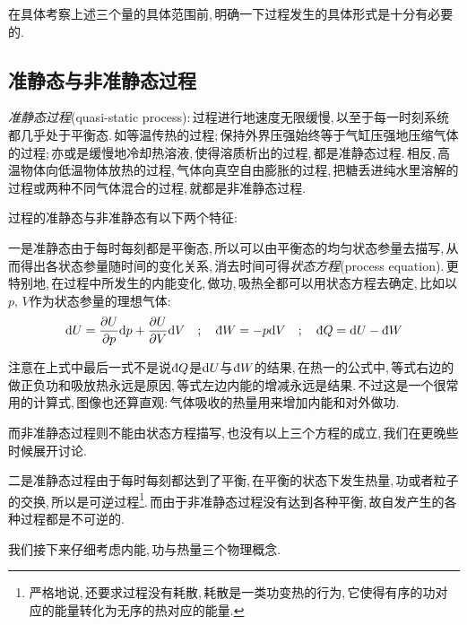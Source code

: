 在具体考察上述三个量的具体范围前,\,明确一下过程发生的具体形式是十分有必要的.


\subsection{准静态与非准静态过程}
\emph{准静态过程}(quasi-static process):\,过程进行地速度无限缓慢,\,以至于每一时刻系统都几乎处于平衡态.\,如等温传热的过程;\,保持外界压强始终等于气缸压强地压缩气体的过程;\,亦或是缓慢地冷却热溶液,\,使得溶质析出的过程,\,都是准静态过程.\,相反,\,高温物体向低温物体放热的过程,\,气体向真空自由膨胀的过程,\,把糖丢进纯水里溶解的过程或两种不同气体混合的过程,\,就都是非准静态过程.

过程的准静态与非准静态有以下两个特征:

一是准静态由于每时每刻都是平衡态,\,所以可以由平衡态的均匀状态参量去描写,\,从而得出各状态参量随时间的变化关系,\,消去时间可得\emph{状态方程}(process equation).\,更特别地,\,在过程中所发生的内能变化,\,做功,\,吸热全都可以用状态方程去确定,\,比如以$p,\,V$作为状态参量的理想气体:
\[\ud U=\frac{\partial U}{\partial p}\ud p + \frac{\partial U}{\partial V}\ud V \quad ; \quad \dbar W =-p\ud V \quad ; \quad \dbar Q=\ud U-\dbar W \]

注意在上式中最后一式不是说$\dbar Q$是$\textrm{d} U$与$\dbar W$的结果,\,在热一的公式中,\,等式右边的做正负功和吸放热永远是原因,\,等式左边内能的增减永远是结果.\,不过这是一个很常用的计算式,\,图像也还算直观:\,气体吸收的热量用来增加内能和对外做功.

而非准静态过程则不能由状态方程描写,\,也没有以上三个方程的成立,\,我们在更晚些时候展开讨论.

二是准静态过程由于每时每刻都达到了平衡,\,在平衡的状态下发生热量,\,功或者粒子的交换,\,所以是可逆过程\footnote{严格地说,\,还要求过程没有耗散,\,耗散是一类功变热的行为,\,它使得有序的功对应的能量转化为无序的热对应的能量.}.\,而由于非准静态过程没有达到各种平衡,\,故自发产生的各种过程都是不可逆的.

我们接下来仔细考虑内能,\,功与热量三个物理概念.


